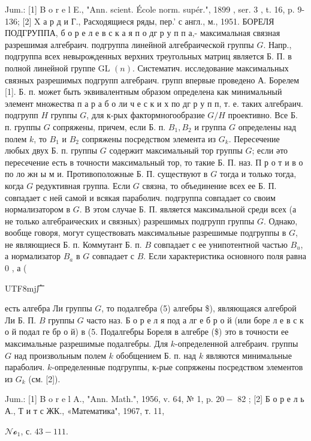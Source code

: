 \documentclass[10pt]{article}
\begin{document}
Jum.: [1] B o r e l E., "Ann. scient. École norm. supér.", 1899 , ser. 3 , t. 16, p. 9-136; [2] X а р д и Г., Расходящиеся ряды, пер.' с англ., м., 1951. БОРЕЛЯ ПОДГРУППА, б о р е л е в с к а я п о дг р у п п а,- максимальная связная разрешимая алгебраич. подгруппа линейной алгебраической группы $G$. Напр., подгруппа всех невырожденных верхних треугольных матриц является Б. П. в полной линейной группе GL $(n)$. Систематич. исследование максимальных связных разрешимых подгрупп алгебраич. групп впервые проведено А. Борелем [1]. Б. п. может быть эквивалентным образом определена как минимальный элемент множества п а р а б о ли ч е с к и х по дг р у п п, т. е. таких алгебраич. подгрупп $H$ группы $G$, для к-рых фактормногообразие $G / H$ проективно. Все Б. п. группы $G$ сопряжены, причем, если Б. п. $B_{1}, B_{2}$ и группа $G$ определены над полем $k$, то $B_{1}$ и $B_{2}$ сопряжены посредством элемента из $G_{k}$. Пересечение любых двух Б. п. группы $G$ содержит максимальный тор группы $G$; если әто пересечение есть в точности максимальный тор, то такие Б. П. наз. П р о т и в о по ло жн ы м и. Противоположные Б. П. существуют в $G$ тогда и только тогда, когда $G$ редуктивная группа. Если $G$ связна, то объединение всех ее Б. П. совпадает с ней самой и всякая параболич. подгруппа совпадает со своим нормализатором в $G$. В этом случае Б. П. является максимальной среди всех (а не только алгебраических и связных) разрешимых подгрупп группы $G$. Однако, вообще говоря, могут существовать максимальные разрешимые подгруппы в $G$, не являющиеся Б. п. Коммутант Б. п. $B$ совпадает с ее унипотентной частью $B_{u}$, а нормализатор $B_{a}$ в $G$ совпадает с $B$. Если характеристика основного поля равна 0 , а (\begin{CJK}{UTF8}{mj}广\end{CJK} есть алгебра Ли группы $G$, то подалгебра (5) алгебры \$), являющаяся алгеброй Ли Б. П. $B$ группы $G$ часто наз. Б о р е л я под а лг е б р о й (или боре л е в с к о й подал ге бр о й) в (5. Подалгебры Бореля в алгебре (\$) это в точности ее максимальные разрешимые подалгебры. Для $k$-определенной алгебраич. группы $G$ над произвольным полем $k$ обобщением Б. п. над $k$ являются минимальные параболич. $k$-определенные подгруппы, к-рые сопряжены посредством элементов из $G_{k}$ (см. [2]).



Jum.: [1] B o r e l A., "Ann. Math.", 1956, v. 64, № 1, p. $20-$ 82 ; [2] Б о р е л ь А., Т и т с ЖК., «Математика", 1967, т. 11,

$\mathcal{N o}_{1}$, с. $43-111$.
\end{document}
